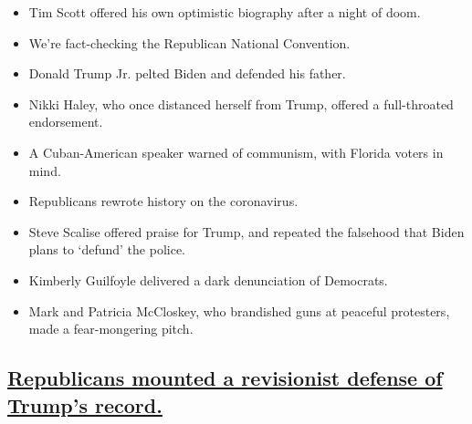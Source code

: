 \begin{itemize}
\item
  \protect\hyperlink{tim-scott-offered-his-own-optimistic-biography-after-a-night-of-doom}{}

  Tim Scott offered his own optimistic biography after a night of doom.
\item
  \protect\hyperlink{were-fact-checking-the-republican-national-convention}{}

  We're fact-checking the Republican National Convention.
\item
  \protect\hyperlink{donald-trump-jr-pelted-biden-and-defended-his-father}{}

  Donald Trump Jr. pelted Biden and defended his father.
\item
  \protect\hyperlink{Nikki-Haley-who-once-distanced-herself-from-Trump-offered-a-full-throated-endorsement}{}

  Nikki Haley, who once distanced herself from Trump, offered a
  full-throated endorsement.
\item
  \protect\hyperlink{a-cuban-american-speaker-warned-of-communism-with-florida-voters-in-mind}{}

  A Cuban-American speaker warned of communism, with Florida voters in
  mind.
\item
  \protect\hyperlink{republicans-rewrote-history-on-the-coronavirus}{}

  Republicans rewrote history on the coronavirus.
\item
  \protect\hyperlink{steve-scalise-offered-praise-for-trump-and-repeated-the-falsehood-that-biden-plans-to-defund-the-police}{}

  Steve Scalise offered praise for Trump, and repeated the falsehood
  that Biden plans to `defund' the police.
\item
  \protect\hyperlink{kimberly-guilfoyle-delivered-a-dark-denunciation-of-democrats}{}

  Kimberly Guilfoyle delivered a dark denunciation of Democrats.
\item
  \protect\hyperlink{mark-and-patricia-mccloskey-who-brandished-guns-at-peaceful-protesters-made-a-fear-mongering-pitch}{}

  Mark and Patricia McCloskey, who brandished guns at peaceful
  protesters, made a fear-mongering pitch.
\end{itemize}

\hypertarget{republicans-mounted-a-revisionist-defense-of-trumps-record}{%
\subsection{\texorpdfstring{\protect\hyperlink{republicans-mounted-a-revisionist-defense-of-trumps-record}{Republicans
mounted a revisionist defense of Trump's
record.}}{Republicans mounted a revisionist defense of Trump's record.}}\label{republicans-mounted-a-revisionist-defense-of-trumps-record}}

